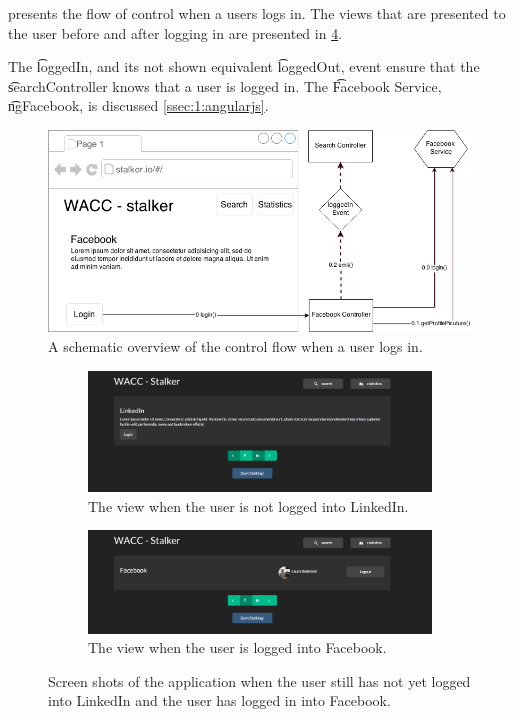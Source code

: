 		 presents the flow of control when a users logs in. The views that are presented to the user before and after logging in are presented in \cref{fig:1:viewLogIn}.

		The \t{loggedIn}, and its not shown equivalent \t{loggedOut}, event ensure that the \t{searchController} knows that a user is logged in. The \t{Facebook Service}, \t{ngFacebook}, is discussed \vref{ssec:1:angularjs}.

		\begin{figure}
			\includegraphics[width=\textwidth]{./img/1_login_flow}
			\caption{A schematic overview of the control flow when a user logs in.}
			\label{fig:1:controlflowLogIn}
		\end{figure}

		\begin{figure}
			\begin{subfigure}{\textwidth}
				\includegraphics[width=\textwidth]{./img/1_login_view_logged_out}
				\caption{The view when the user is not logged into LinkedIn.}
				\label{fig:1:viewLogIn:linkedin}
			\end{subfigure}
			\begin{subfigure}{\textwidth}
				\includegraphics[width=\textwidth]{./img/1_login_view_logged_in}
				\caption{The view when the user is logged into Facebook.}
				\label{fig:1:viewLogIn:facebook}
			\end{subfigure}			
			\caption{Screen shots of the application when  the user still has not yet logged into LinkedIn and  the user has logged in into Facebook.}
			\label{fig:1:viewLogIn}
		\end{figure}	

